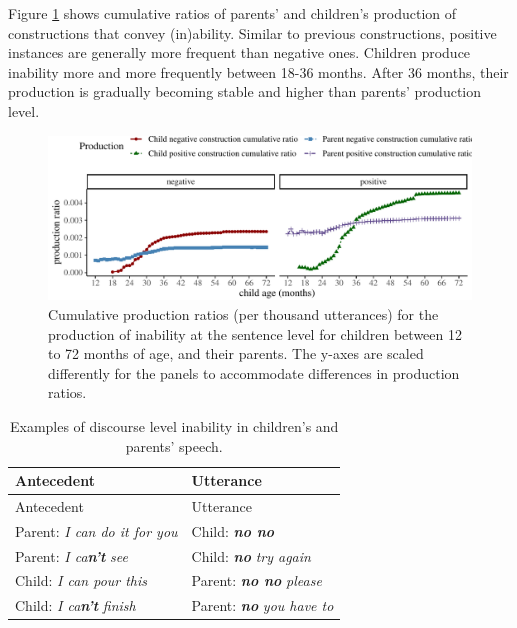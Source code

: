 \documentclass[
  man,floatsintext]{apa6}
\begin{document}
Figure \ref{fig:inability} shows cumulative ratios of parents' and children's production of constructions that convey (in)ability. Similar to previous constructions, positive instances are generally more frequent than negative ones. Children produce inability more and more frequently between 18-36 months. After 36 months, their production is gradually becoming stable and higher than parents' production level.

\begin{figure}[H]

{\centering \includegraphics{neg_construction_article_files/figure-latex/inability-1} 

}

\caption{Cumulative production ratios (per thousand utterances) for the production of inability at the sentence level for children between 12 to 72 months of age, and their parents. The y-axes are scaled differently for the panels to accommodate differences in production ratios.}\label{fig:inability}
\end{figure}

\begin{longtable}[]{@{}ll@{}}
\caption{\label{tab:disinability} Examples of discourse level inability in children's and parents' speech.}\tabularnewline
\toprule\noalign{}
Antecedent & Utterance \\
\midrule\noalign{}
\endfirsthead
\toprule\noalign{}
Antecedent & Utterance \\
\midrule\noalign{}
\endhead
\bottomrule\noalign{}
\endlastfoot
Parent: \emph{I can do it for you} & Child: \textbf{\emph{no no}} \\
Parent: \emph{I ca\textbf{n't}} \emph{see} & Child: \textbf{\emph{no}} \emph{try again} \\
Child: \emph{I can pour this} & Parent: \textbf{\emph{no no}} \emph{please} \\
Child: \emph{I ca\textbf{n't}} \emph{finish} & Parent: \textbf{\emph{no}} \emph{you have to} \\
\end{longtable}
\end{document}
